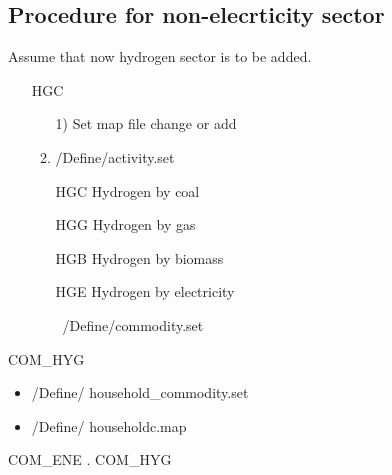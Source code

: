 \documentclass[10pt,a4paper,titlepage,dvipdfmx]{book}
\begin{document}
\subsection{\label{subsec:ProNonEleSec}Procedure for non-elecrticity sector}

Assume that now hydrogen sector is to be added.
\begin{enumerate}
\item [HGC]
\begin{enumerate}
\item[1)]Set map file change or add

\item/Define/activity.set
\item[HGC]Hydrogen by coal
\item[HGG]Hydrogen by gas
\item[HGB]Hydrogen by biomass
\item[HGE]Hydrogen by electricity

~/Define/commodity.set
\end{enumerate}
\end{enumerate}
COM\_HYG
\begin{itemize}
\item /Define/ household\_commodity.set
\item /Define/ householdc.map
\end{itemize}
COM\_ENE . COM\_HYG
\end{document}
